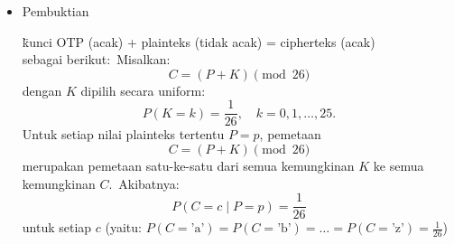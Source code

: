 \documentclass{article}
\begin{document}

\begin{itemize}
  \item Pembuktian
  
  \"kunci OTP (acak) + plainteks (tidak acak) = cipherteks (acak)\" \\
  sebagai berikut:\
  Misalkan:\n  \[ C = (P + K) \pmod{26} \]
  dengan $K$ dipilih secara uniform:\n  \[ P(K = k) = \frac{1}{26}, \quad k = 0, 1, \dots, 25. \]
  Untuk setiap nilai plainteks tertentu $P = p$, pemetaan
  \[ C = (P + K) \pmod{26} \]
  merupakan pemetaan satu-ke-satu dari semua kemungkinan $K$ ke semua kemungkinan $C$.\
  Akibatnya:\n  \[ P(C = c \mid P = p) = \frac{1}{26} \]
  untuk setiap $c$ (yaitu: $P(C = \text{'a'}) = P(C = \text{'b'}) = \dots = P(C = \text{'z'}) = \frac{1}{26}$)
\end{itemize}
\end{document}
